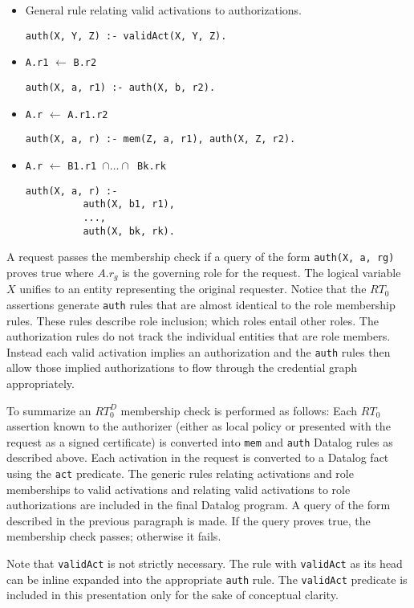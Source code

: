 \documentclass{article}
\newcommand{\predicate}[1]{\texttt{#1}}
\newcommand{\memcert}[2]{\texttt{#1} $\leftarrow$ \texttt{#2}}
\begin{document}
\begin{itemize}

\item General rule relating valid activations to authorizations.

\texttt{auth(X, Y, Z) :- validAct(X, Y, Z).}

\item \memcert{A.r1}{B.r2}

\texttt{auth(X, a, r1) :- auth(X, b, r2).}

\item \memcert{A.r}{A.r1.r2}

\texttt{auth(X, a, r) :- mem(Z, a, r1), auth(X, Z, r2).}

\item \memcert{A.r}{B1.r1 $\cap \ldots \cap$ Bk.rk}
\begin{verbatim}
auth(X, a, r) :-
          auth(X, b1, r1),
          ...,
          auth(X, bk, rk).
\end{verbatim}
\end{itemize}

A request passes the membership check if a query of the form \texttt{auth(X, a, rg)} proves true
where $A.r_g$ is the governing role for the request. The logical variable $X$ unifies to an
entity representing the original requester. Notice that the $RT_0$ assertions generate
\predicate{auth} rules that are almost identical to the role membership rules. These rules
describe role inclusion; which roles entail other roles. The authorization rules do not track
the individual entities that are role members. Instead each valid activation implies an
authorization and the \predicate{auth} rules then allow those implied authorizations to flow
through the credential graph appropriately.

To summarize an $RT_0^D$ membership check is performed as follows: Each $RT_0$ assertion known
to the authorizer (either as local policy or presented with the request as a signed certificate)
is converted into \predicate{mem} and \predicate{auth} Datalog rules as described above. Each
activation in the request is converted to a Datalog fact using the \predicate{act} predicate.
The generic rules relating activations and role memberships to valid activations and relating
valid activations to role authorizations are included in the final Datalog program. A query of
the form described in the previous paragraph is made. If the query proves true, the membership
check passes; otherwise it fails.

Note that \predicate{validAct} is not strictly necessary. The rule with \predicate{validAct} as
its head can be inline expanded into the appropriate \predicate{auth} rule. The
\predicate{validAct} predicate is included in this presentation only for the sake of conceptual
clarity.
\end{document}
